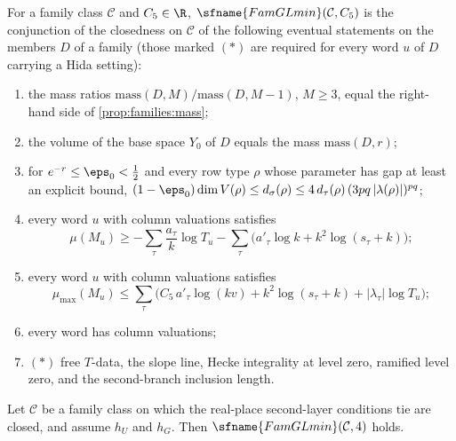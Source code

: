 \begin{definition}\label{pf:top-shape:famglmin}
For a family class $\mathcal C$ and $C_5\in\R$, $\sfname{FamGLmin}(\mathcal C,C_5)$ is the conjunction of the
closedness on $\mathcal C$ of the following eventual statements on the members $D$ of a family (those marked $(\ast)$
are required for every word $u$ of $D$ carrying a Hida setting):
\begin{enumerate}[label=(G\arabic*)]
\item\label{G:mass} the mass ratios $\mathrm{mass}(D,M)/\mathrm{mass}(D,M-1)$, $M\ge3$, equal the right-hand side of
\cref{prop:families:mass};
\item the volume of the base space $Y_0$ of $D$ equals the mass $\mathrm{mass}(D,r)$;
\item\label{G:sigma} for $e^{-r}\le\eps_0<\frac12$ and every row type $\rho$ whose parameter has gap at least an explicit
bound, $(1-\eps_0)\dim V(\rho)\le d_\sigma(\rho)\le4\,d_\tau(\rho)\,(3pq\,|\lambda(\rho)|)^{pq}$;
\item\label{G:low} every word $u$ with column valuations satisfies
\[
\mu(M_u)\ge-\sum_\tau\frac{a_\tau}k\log T_u-\sum_\tau\bigl(a'_\tau\log k+k^2\log(s_\tau+k)\bigr);
\]
\item\label{G:max} every word $u$ with column valuations satisfies
\[
\mu_{\max}(M_u)\le\sum_\tau\bigl(C_5\,a'_\tau\log(kv)+k^2\log(s_\tau+k)+|\lambda_\tau|\log T_u\bigr);
\]
\item\label{G:colval} every word has column valuations;
\item[(G7)--(G11)] $(\ast)$ free $T$-data, the slope line, Hecke integrality at level zero, ramified level zero, and the
second-branch inclusion length.
\end{enumerate}
\end{definition}

\begin{proposition}\label{pf:top-shape:famgl}
Let $\mathcal C$ be a family class on which the real-place second-layer conditions $\mathrm{tie}$ are closed, and
assume $h_U$ and $h_G$. Then $\sfname{FamGLmin}(\mathcal C,4)$ holds.
\end{proposition}

